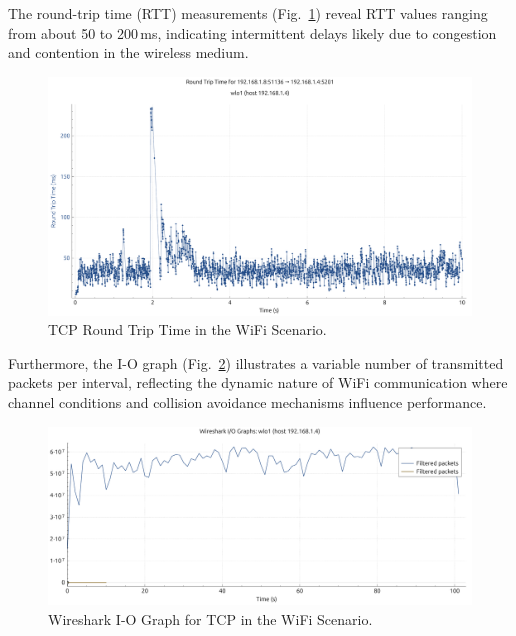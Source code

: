 \begin{enumerate}
                The round-trip time (RTT) measurements (Fig.~\ref{fig:rtt-wifi-tcp}) reveal RTT values ranging from about 50 to 200\,ms, indicating intermittent delays likely due to congestion and contention in the wireless medium. \\
                
                \begin{figure}[ht]
                    \centering
                    \includegraphics[width=0.9\columnwidth]{images/graphs/RTT/RTT_WiFi_TCP.pdf}
                    \caption{TCP Round Trip Time in the WiFi Scenario.}
                    \label{fig:rtt-wifi-tcp}
                \end{figure}    

                Furthermore, the I-O graph (Fig.~\ref{fig:io-wifi-tcp}) illustrates a variable number of transmitted packets per interval, reflecting the dynamic nature of WiFi communication where channel conditions and collision avoidance mechanisms influence performance.
                
                \begin{figure}[ht]
                    \centering
                    \includegraphics[width=0.9\columnwidth]{images/graphs/I-O/I-O_WiFi_TCP.pdf}
                    \caption{Wireshark I-O Graph for TCP in the WiFi Scenario.}
                    \label{fig:io-wifi-tcp}
                \end{figure}


\end{enumerate}
